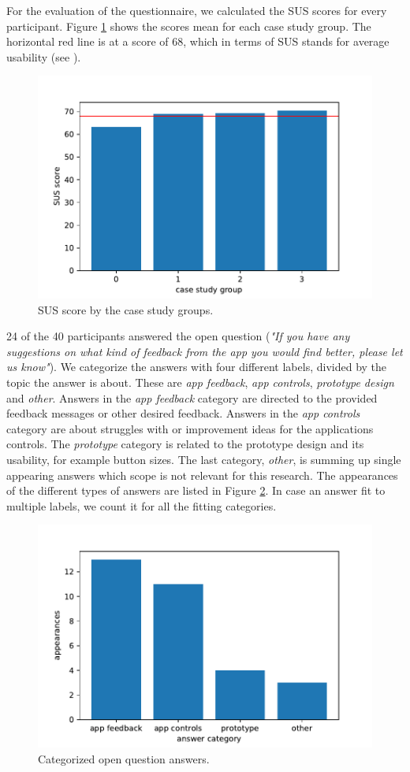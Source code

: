 \documentclass[11pt, a4paper]{article}
\begin{document}
			For the evaluation of the questionnaire, we calculated the \ac{SUS} scores for every participant. Figure \ref{fig:sus} shows the scores mean for each case study group. The horizontal red line is at a score of 68, which in terms of \ac{SUS} stands for average usability (see ).

			\begin{figure}[H]
				\centering
				\includegraphics[width=.49\textwidth]{img/plot/plot_sus.pdf}
				\caption{SUS score by the case study groups.}
				\label{fig:sus}
			\end{figure}

			24 of the 40 participants answered the open question (\emph{"If you have any suggestions on what kind of feedback from the app you would find better, please let us know"}). We categorize the answers with four different labels, divided by the topic the answer is about. These are \emph{app feedback}, \emph{app controls}, \emph{prototype design} and \emph{other}. Answers in the \emph{app feedback} category are directed to the provided feedback messages or other desired feedback. Answers in the \emph{app controls} category are about struggles with or improvement ideas for the applications controls. The \emph{prototype} category is related to the prototype design and its usability, for example button sizes. The last category, \emph{other}, is summing up single appearing answers which scope is not relevant for this research. The appearances of the different types of answers are listed in Figure \ref{fig:tags}. In case an answer fit to multiple labels, we count it for all the fitting categories.

			\begin{figure}[H]
				\centering
				\includegraphics[width=.49\textwidth]{img/plot/plot_tags.pdf}
				\caption{Categorized open question answers.}
				\label{fig:tags}
			\end{figure}
			
\end{document}
